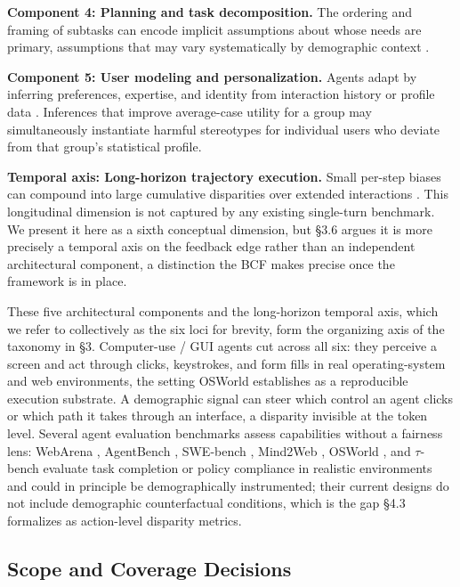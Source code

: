 \documentclass[acmsmall,nonacm]{acmart}
\begin{document}
\textbf{Component 4: Planning and task decomposition.} The ordering and framing of subtasks can encode implicit assumptions about whose needs are primary, assumptions that may vary systematically by demographic context \cite{li2025actions,wu2025reasoning}.

\textbf{Component 5: User modeling and personalization.} Agents adapt by inferring preferences, expertise, and identity from interaction history or profile data \cite{kantharuban2024stereotype}. Inferences that improve average-case utility for a group may simultaneously instantiate harmful stereotypes for individual users who deviate from that group's statistical profile.

\textbf{Temporal axis: Long-horizon trajectory execution.} Small per-step biases can compound into large cumulative disparities over extended interactions \cite{ma2026implicit,wyllie2024fairness}. This longitudinal dimension is not captured by any existing single-turn benchmark. We present it here as a sixth conceptual dimension, but \S{}3.6 argues it is more precisely a temporal axis on the feedback edge rather than an independent architectural component, a distinction the BCF makes precise once the framework is in place.

These five architectural components and the long-horizon temporal axis, which we refer to collectively as the six loci for brevity, form the organizing axis of the taxonomy in \S{}3. Computer-use / GUI agents cut across all six: they perceive a screen and act through clicks, keystrokes, and form fills in real operating-system and web environments, the setting OSWorld \cite{xie2024osworld} establishes as a reproducible execution substrate. A demographic signal can steer which control an agent clicks or which path it takes through an interface, a disparity invisible at the token level. Several agent evaluation benchmarks assess capabilities without a fairness lens: WebArena \cite{zhou2024webarena}, AgentBench \cite{liu2024agentbench}, SWE-bench \cite{jimenez2024swe}, Mind2Web \cite{deng2023mind2web}, OSWorld \cite{xie2024osworld}, and $\tau$-bench \cite{yao2024taubench} evaluate task completion or policy compliance in realistic environments and could in principle be demographically instrumented; their current designs do not include demographic counterfactual conditions, which is the gap \S{}4.3 formalizes as action-level disparity metrics.


\subsection{Scope and Coverage Decisions}
\end{document}
